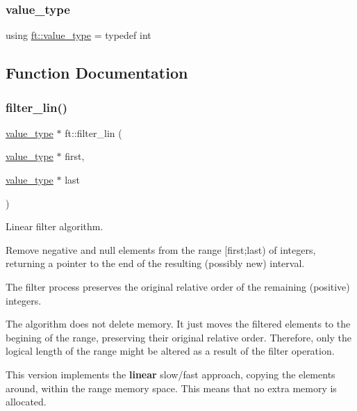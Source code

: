 \subsubsection{\texorpdfstring{value\_type}{value\_type}}
{\footnotesize\ttfamily using \mbox{\hyperlink{namespaceft_a076c091630cdeb4076ec793da6ab56c0}{ft\+::value\+\_\+type}} = typedef int}



\subsection{Function Documentation}
\mbox{\label{namespaceft_a4316f330162c6d79eef57fa84bf0ac68}} 
\subsubsection{\texorpdfstring{filter\_lin()}{filter\_lin()}}
{\footnotesize\ttfamily \mbox{\hyperlink{namespaceft_a076c091630cdeb4076ec793da6ab56c0}{value\+\_\+type}} $\ast$ ft\+::filter\+\_\+lin (\begin{DoxyParamCaption}\item[{\mbox{\hyperlink{namespaceft_a076c091630cdeb4076ec793da6ab56c0}{value\+\_\+type}} $\ast$}]{first,  }\item[{\mbox{\hyperlink{namespaceft_a076c091630cdeb4076ec793da6ab56c0}{value\+\_\+type}} $\ast$}]{last }\end{DoxyParamCaption})}



Linear filter algorithm. 

Remove negative and null elements from the range {\ttfamily \mbox{[}first;last)} of integers, returning a pointer to the end of the resulting (possibly new) interval.

The filter process preserves the original relative order of the remaining (positive) integers.

The algorithm does not delete memory. It just moves the filtered elements to the begining of the range, preserving their original relative order. Therefore, only the logical length of the range might be altered as a result of the filter operation.

This version implements the {\bfseries{linear}} slow/fast approach, copying the elements around, within the range memory space. This means that no extra memory is allocated.

